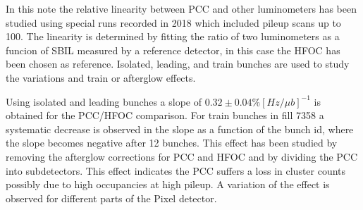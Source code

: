 In this note the relative linearity between PCC and other luminometers has been studied using special runs recorded in 2018 which included pileup scans up to 100.
The linearity is determined by fitting the ratio of two luminometers as a funcion of SBIL measured by a reference detector, in this case the HFOC has been chosen as reference.
Isolated, leading, and train bunches are used to study the variations and train or afterglow effects.

Using isolated and leading bunches a slope of $0.32\pm0.04 \% [Hz/\mu b]^{-1}$ is obtained for the PCC/HFOC comparison.
For train bunches in fill 7358 a systematic decrease is observed in the slope as a function of the bunch id, where the slope becomes negative after 12 bunches.
This effect has been studied by removing the afterglow corrections for PCC and HFOC and by dividing the PCC into subdetectors.
This effect indicates the PCC suffers a loss in cluster counts possibly due to high occupancies at high pileup. 
A variation of the effect is observed for different parts of the Pixel detector.
